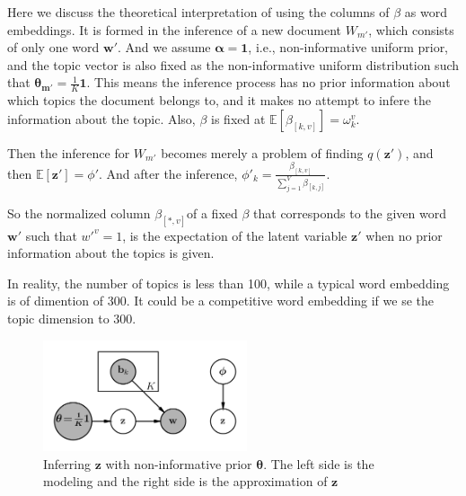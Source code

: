 \documentclass[a4]{article}
\begin{document}
Here we discuss the theoretical interpretation of using the columns of $\beta$ as word embeddings.
It is formed in the inference of a new document $W_{m'}$, which consists of only one word $\bm{w'}$.
And we assume $\bm{\alpha}=\bm{1}$, i.e., non-informative uniform prior, and the topic vector
is also fixed as the non-informative uniform distribution such that $\bm{\theta_{m'}}= \frac{1}{K}\bm{1}$.
This means the inference process has no prior information about which topics the document belongs to, and it
makes no attempt to infere the information about the topic.
Also, $\beta$ is fixed at $\mathbb{E}[\beta_{[k,v]}] = \omega_k^v$.

Then the inference for $W_{m'}$ becomes merely a problem of finding $q(\bm{z}')$, and then $\mathbb{E}[\bm{z'}] = \phi'$.
And after the inference, $\phi'_k = \frac{\beta_{[k,v]} }{\sum_{j=1}^V\beta_{[k,j]} }$.

So the normalized column $\beta_{[*,v]}$of a fixed $\beta$ that corresponds to the given word $\bm{w}'$ such that $w'^v = 1$,
is the expectation of the latent variable $\bm{z}'$ when no prior information about the topics is given.

In reality, the number of topics is less than 100, while a typical word embedding is of dimention of 300.
It could be a competitive word embedding if we se the topic dimension to 300.

\begin{figure}
\centering
\includegraphics[width=6cm]{lda_word_embedding.png}
\caption{Inferring $\mathbf{z}$ with non-informative prior $\bm{\theta}$. The left side is the modeling and the right side is the approximation of $\mathbf{z}$}
\label{fig:lda_inference}
\end{figure}

{}

\end{document}
